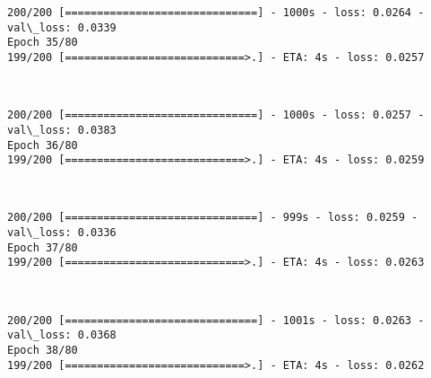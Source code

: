 \documentclass[11pt]{article}
\begin{document}
    \begin{Verbatim}[commandchars=\\\{\}]
200/200 [==============================] - 1000s - loss: 0.0264 - val\_loss: 0.0339
Epoch 35/80
199/200 [============================>.] - ETA: 4s - loss: 0.0257
    \end{Verbatim}

    \begin{center}
    \end{center}
    { \hspace*{\fill} \\}
    
    \begin{Verbatim}[commandchars=\\\{\}]
200/200 [==============================] - 1000s - loss: 0.0257 - val\_loss: 0.0383
Epoch 36/80
199/200 [============================>.] - ETA: 4s - loss: 0.0259
    \end{Verbatim}

    \begin{center}
    \end{center}
    { \hspace*{\fill} \\}
    
    \begin{Verbatim}[commandchars=\\\{\}]
200/200 [==============================] - 999s - loss: 0.0259 - val\_loss: 0.0336
Epoch 37/80
199/200 [============================>.] - ETA: 4s - loss: 0.0263
    \end{Verbatim}

    \begin{center}
    \end{center}
    { \hspace*{\fill} \\}
    
    \begin{Verbatim}[commandchars=\\\{\}]
200/200 [==============================] - 1001s - loss: 0.0263 - val\_loss: 0.0368
Epoch 38/80
199/200 [============================>.] - ETA: 4s - loss: 0.0262
    \end{Verbatim}

    \begin{center}
    \end{center}
    { \hspace*{\fill} \\}
    
\end{document}

